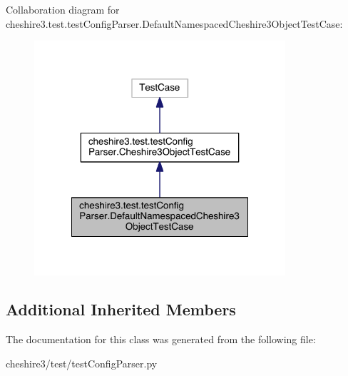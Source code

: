 Collaboration diagram for cheshire3.\-test.\-test\-Config\-Parser.\-Default\-Namespaced\-Cheshire3\-Object\-Test\-Case\-:
\nopagebreak
\begin{figure}[H]
\begin{center}
\leavevmode
\includegraphics[width=264pt]{classcheshire3_1_1test_1_1test_config_parser_1_1_default_namespaced_cheshire3_object_test_case__coll__graph}
\end{center}
\end{figure}
\subsection*{Additional Inherited Members}


The documentation for this class was generated from the following file\-:\begin{DoxyCompactItemize}
\item 
cheshire3/test/test\-Config\-Parser.\-py\end{DoxyCompactItemize}
